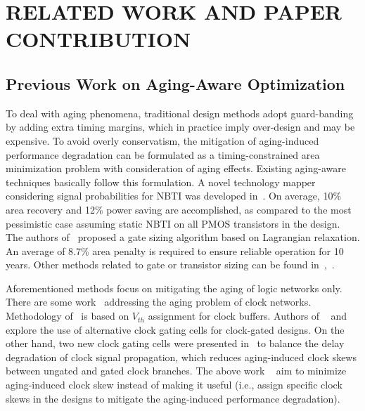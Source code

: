 \section{RELATED WORK AND PAPER CONTRIBUTION}
\label{sec:related}
\subsection{Previous Work on Aging-Aware Optimization}
\label{subsec:rw}
To deal with aging phenomena, traditional design methods adopt guard-banding by adding extra timing margins, which in practice imply over-design and may be expensive. To avoid overly conservatism, the mitigation of aging-induced performance degradation can be formulated as a timing-constrained area minimization problem with consideration of aging effects. Existing aging-aware techniques basically follow this formulation. A novel technology mapper considering signal probabilities for NBTI was developed in~\cite{kumar2007nbti}. On average, 10\% area recovery and 12\% power saving are accomplished, as compared to the most pessimistic case assuming static NBTI on all PMOS transistors in the design. The authors of~\cite{paul2006temporal} proposed a gate sizing algorithm based on Lagrangian relaxation. An average of 8.7\% area penalty is required to ensure reliable operation for 10 years. Other methods related to gate or transistor sizing can be found in~\cite{kang2007efficient},~\cite{yang2007combating}.

Aforementioned methods focus on mitigating the aging of logic networks only. There are some work~\cite{huang2013low, chakraborty2013skew,chen2013novel} addressing the aging problem of clock networks. Methodology of~\cite{chen2013novel} is based on $V_{th}$ assignment for clock buffers. Authors of ~\cite{huang2013low} and ~\cite{chakraborty2013skew} explore the use of alternative clock gating cells for clock-gated designs. On the other hand, two new clock gating cells were presented in~\cite{lai2014bti} to balance the delay degradation of clock signal propagation, which reduces aging-induced clock skews between ungated and gated clock branches. The above work ~\cite{huang2013low, chakraborty2013skew,chen2013novel,lai2014bti} aim to minimize aging-induced clock skew instead of making it useful (i.e., assign specific clock skews in the designs to mitigate the aging-induced performance degradation).


